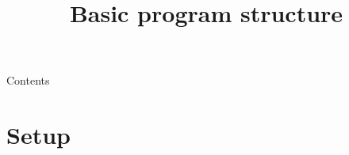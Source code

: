 
\usepackage{tikz}
\usepackage{hyperref}

\newcommand{\topic}{
    Basic program structure
}


\title{\topic}
\supertitle{\course}
\date{}



\maketitle

\begin{frame}{Contents}
	\tableofcontents
\end{frame}

\section{Setup}
